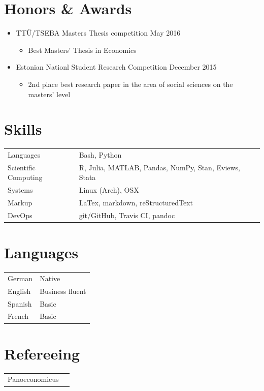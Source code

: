 \documentclass[11pt,letter,sans]{moderncv}
\begin{document}
\section{Honors \& Awards}
\begin{itemize}
    \item TTÜ/TSEBA Masters Thesis competition \hfill May 2016
      \begin{itemize}
      \item Best Masters' Thesis in Economics
      \end{itemize}
    \item Estonian Nationl Student Research Competition \hfill December 2015
      \begin{itemize}
      \item 2nd place best research paper in the area of social sciences on the masters' level
      \end{itemize}
\end{itemize}


\section{Skills}
\begin{tabular}{p{1.5in}p{5in}}
    Languages & Bash, Python \\
    Scientific Computing & R, Julia, MATLAB, Pandas, NumPy, Stan, Eviews, Stata \\
    Systems & Linux (Arch), OSX \\
    Markup & LaTex, markdown, reStructuredText \\
    DevOps & git/GitHub, Travis CI, pandoc \\
\end{tabular}


\section{Languages}
\begin{tabular}{p{1.5in}p{5in}}
    German & Native \\
    English & Business fluent \\
    Spanish & Basic \\
    French & Basic \\
\end{tabular}


\section{Refereeing}
\begin{tabular}{p{1.5in}p{5in}}
    Panoeconomicus \\
\end{tabular}
\end{document}
